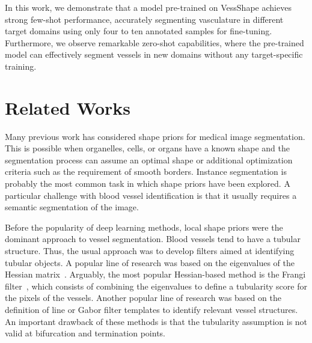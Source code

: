 \documentclass[%
reprint,
nofootinbib,
 amsmath,amssymb,
aps,
superscriptaddress,
showkeys,
longbibliography
]{revtex4-1}
\begin{document}
In this work, we demonstrate that a model pre-trained on VessShape achieves strong few-shot performance, accurately segmenting vasculature in different target domains using only four to ten annotated samples for fine-tuning. Furthermore, we observe remarkable zero-shot capabilities, where the pre-trained model can effectively segment vessels in new domains without any target-specific training.

\section{Related Works}
\label{sec:related}

Many previous work has considered shape priors for medical image segmentation. This is possible when organelles, cells, or organs have a known shape and the segmentation process can assume an optimal shape or additional optimization criteria such as the requirement of smooth borders. Instance segmentation is probably the most common task in which shape priors have been explored. A particular challenge with blood vessel identification is that it usually requires a semantic segmentation of the image. 

Before the popularity of deep learning methods, local shape priors were the dominant approach to vessel segmentation. Blood vessels tend to have a tubular structure. Thus, the usual approach was to develop filters aimed at identifying tubular objects. A popular line of research was based on the eigenvalues of the Hessian matrix~\cite{fraz2012blood,sato1998three}. Arguably, the most popular Hessian-based method is the Frangi filter~\cite{frangi1998multiscale}, which consists of combining the eigenvalues to define a tubularity score for the pixels of the vessels. Another popular line of research was based on the definition of line or Gabor filter templates to identify relevant vessel structures. An important drawback of these methods is that the tubularity assumption is not valid at bifurcation and termination points.
\end{document}
